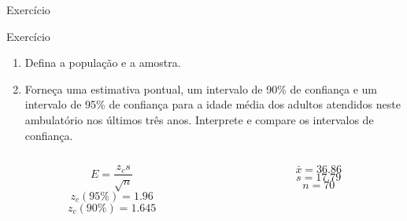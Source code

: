 \documentclass{beamer}
\begin{document}
\begin{frame}{Exercício}
  \begin{block}{Exercício}
    \begin{enumerate}
    \item Defina a população e a amostra.
    \item Forneça uma estimativa pontual, um intervalo de 90\% de
      confiança e um intervalo de 95\% de confiança para a idade média
      dos adultos atendidos neste ambulatório nos últimos três
      anos. Interprete e compare os intervalos de confiança.
    \end{enumerate}
  \end{block}

  \begin{block}{}
    \begin{columns}
      \begin{column}{5cm}
    \begin{displaymath}
      E = \frac{z_c s}{\sqrt{n}}
    \end{displaymath}
    \begin{displaymath}
      z_c (95\%) = 1.96
    \end{displaymath}
    \begin{displaymath}
      z_c (90\%) = 1.645
    \end{displaymath}
  \end{column}
  \begin{column}{5cm}
    \begin{displaymath}
      \bar{x} = 36.86
    \end{displaymath}
    \begin{displaymath}
      s = 17.79
    \end{displaymath}
    \begin{displaymath}
      n = 70
    \end{displaymath}
  \end{column}
\end{columns}
\end{block}
\end{frame}
\end{document}

